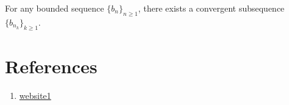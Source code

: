 \documentclass[parskip=half, numbers=endperiod, 11pt]{scrartcl}
\begin{document}
\begin{theorem}\label{thm:bolzano_weirstrass}
	For any bounded sequence $\{b_n\}_{n \ge 1}$, there
	exists a convergent subsequence
	$\{b_{n_k}\}_{k \ge 1}$.
\end{theorem}

\section{References}

\begin{enumerate}
	\item \href{https://encyclopedia.pub/entry/37221}{website1}
\end{enumerate}
\end{document}

